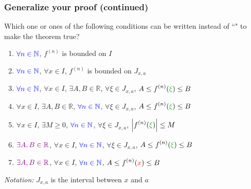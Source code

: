 \documentclass[14pt]{beamer}
\newcommand {\DS} [1] {${\displaystyle #1}$}
\newcommand {\R}{\mathbb{R}}
\newcommand {\N}{\mathbb{N}}
\newcommand{\azul}[1]{{\color{blue} #1}}
\newcommand{\rojo}[1]{{\color{red} #1}}
\newcommand{\verde}[1]{{\color{verde} #1}}
\newcommand{\violeta}[1]{{\color{violet} #1}}
\newcommand{\setsize}[1]{\fontsize{#1}{#1}\selectfont} %
\newcommand{\vv}{\vspace{.5cm}}
\newcommand{\vvv}{\vspace{.2cm}}
\begin{document}
\begin{frame}[t]
\setsize{12}
\frametitle{Generalize your proof (continued)}

Which one or ones of the following conditions can be written instead of ``" to make the theorem true?
\vvv
\begin{enumerate}
	\item  \DS{\azul{\forall n \in \N}}, \; \DS{f^{(n)}} is bounded on $I$
\vvv
	\item  \DS{\azul{\forall n \in \N}}, \; \rojo{\DS{\forall x \in I}}, \; \DS{f^{(n)}} is bounded on $J_{x,a}$
\vvv
	\item  \DS{\azul{\forall n \in \N}}, \; \rojo{\DS{\forall x \in I}}, \; \violeta{\DS{\exists A, B \in \R}},  \; \verde{\DS{\forall \xi \in J_{x,a}}}, \; \DS{A \leq f^{(n)}(\verde{\xi}) \leq B}
\vvv
	\item  \rojo{\DS{\forall x \in I}},  \; \violeta{\DS{\exists A, B \in \R}},  \; \DS{\azul{\forall n \in \N}},  \; \verde{\DS{\forall \xi \in J_{x,a}}}, \; \DS{A \leq f^{(n)}(\verde{\xi}) \leq B}
\vvv
	\item  \rojo{\DS{\forall x \in I}},  \; \violeta{\DS{\exists M \geq 0}},  \; \DS{\azul{\forall n \in \N}},  \; \verde{\DS{\forall \xi \in J_{x,a}}}, \; \DS{\left\vert f^{(n)}(\verde{\xi}) \right\vert \leq M}
\vvv
	\item  \DS{\violeta{\exists A, B \in \R}}, \; \rojo{\DS{\forall x \in I}},  \; \DS{\azul{\forall n \in \N}},  \; \verde{\DS{\forall \xi \in J_{x,a}}}, \; \DS{A \leq f^{(n)}(\verde{\xi}) \leq B}
\vvv
	\item  \DS{\violeta{\exists A, B \in \R}}, \; \rojo{\DS{\forall x \in I}},  \; \DS{\azul{\forall n \in \N}},  \; \DS{A \leq f^{(n)}(\rojo{x}) \leq B}
\end{enumerate}
\vv

\emph{Notation:}  \DS{J_{x,a}} is the interval between $x$ and $a$

\end{frame}
\end{document}
